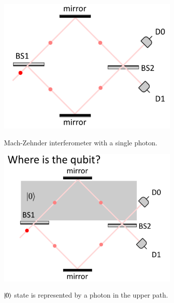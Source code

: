 \begin{figure}[H]
   \centering
    \includegraphics[width=0.8\textwidth]{lesson6/mach_zehnder_single_photon.pdf}
    \label{fig: 1}
    
        \caption{Mach-Zehnder interferometer with a single photon.}
    
\end{figure}

\begin{figure}[H]
   \centering
    \includegraphics[width=0.8\textwidth]{lesson6/0_ket_botttom.pdf}
    \label{fig: 1}
    
        \caption{$\ket{0}$ state is represented by a photon in the upper path.}
    
\end{figure}

